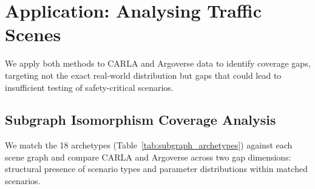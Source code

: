 \section{Application: Analysing Traffic Scenes}
\label{chapter:application}

We apply both methods to CARLA and Argoverse data to identify coverage gaps, targeting not the exact real-world distribution but gaps that could lead to insufficient testing of safety-critical scenarios.


\subsection{Subgraph Isomorphism Coverage Analysis}
We match the 18 archetypes (Table~\ref{tab:subgraph_archetypes}) against each scene graph and compare CARLA and Argoverse across two gap dimensions: structural presence of scenario types and parameter distributions within matched scenarios.

